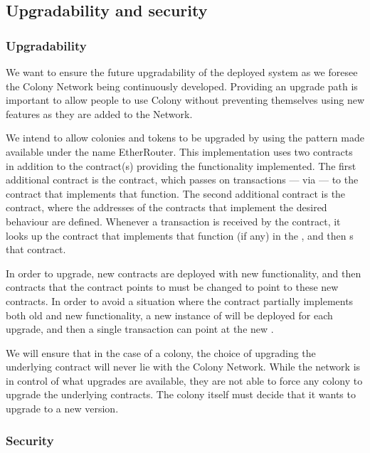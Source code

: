 \subsection{Upgradability and security}\label{subsec:upgradability}\label{sec:escape-hatches}

\subsubsection{Upgradability}

We want to ensure the future upgradability of the deployed system as we foresee the Colony Network being continuously developed. Providing an upgrade path is important to allow people to use Colony without preventing themselves using new features as they are added to the Network.

We intend to allow colonies and tokens to be upgraded by using the pattern made available under the name EtherRouter\cite{EtherRouter}. This implementation uses two contracts in addition to the contract(s) providing the functionality implemented. The first additional contract is the  contract, which passes on transactions --- via  --- to the contract that implements that function. The second additional contract is the  contract, where the addresses of the contracts that implement the desired behaviour are defined. Whenever a transaction is received by the  contract, it looks up the contract that implements that function (if any) in the , and then s that contract.

In order to upgrade, new contracts are deployed with new functionality, and then contracts that the  contract points to must be changed to point to these new contracts. In order to avoid a situation where the contract partially implements both old and new functionality,  a new instance of  will be deployed for each upgrade, and then a single transaction can point  at the new .

We will ensure that in the case of a colony, the choice of upgrading the underlying  contract will never lie with the Colony Network. While the network is in control of what upgrades are available, they are not able to force any colony to upgrade the underlying contracts. The colony itself must decide that it wants to upgrade to a new version.

\subsubsection{Security}


